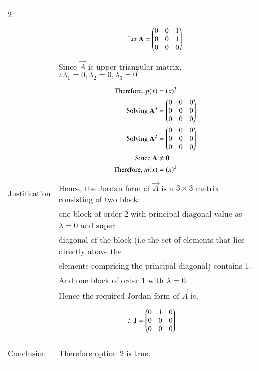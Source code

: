 \begin{longtable}{|l|l|}
&\\
\hline
\pagebreak
\hline
&\\
2.&\\
&\parbox{6cm}{\begin{align*}
    \mbox{Let }\mathbf{A}&=\begin{pmatrix}0&0&1\\0&0&1\\0&0&0\end{pmatrix}\\
\end{align*}}\\
&Since $\vec{A}$ is upper triangular matrix, $\therefore \lambda_{1}=0,\lambda_{2}=0,\lambda_{3}=0$ \\
&\parbox{6cm}{\begin{align*}
    \mbox{Therefore, }p(x)&=(x)^3\\
    \mbox{Solving }\mathbf{A}^3&=\begin{pmatrix}0&0&0\\0&0&0\\0&0&0\end{pmatrix}\\
    \mbox{Solving }\mathbf{A}^2&=\begin{pmatrix}0&0&0\\0&0&0\\0&0&0\end{pmatrix}\\
    \mbox{Since }\mathbf{A}&\neq \mathbf{0}\\
    \mbox{Therefore, }m(x)&=(x)^2\\
    \end{align*}}\\
Justification&Hence, the Jordan form of $\vec{A}$ is a $3 \times 3$ matrix consisting of two block:\\
&one block of order 2 with principal diagonal value as $\lambda = 0$ and super\\
&diagonal of the block (i.e the set of elements that lies directly above the\\
&elements comprising the principal diagonal) contains 1.\\
&And one block of order 1 with $\lambda=0$.\\
&Hence the required Jordan form of $\vec{A}$ is,\\
&\parbox{6cm}{\begin{align*}
    \therefore \mathbf{J}&=\begin{pmatrix}0&1&0\\0&0&0\\0&0&0\end{pmatrix}
\end{align*}}\\
&\\
\hline
&\\
Conclusion&Therefore option 2 is true.\\
&\\
\hline
\pagebreak
\hline

\end{longtable}
